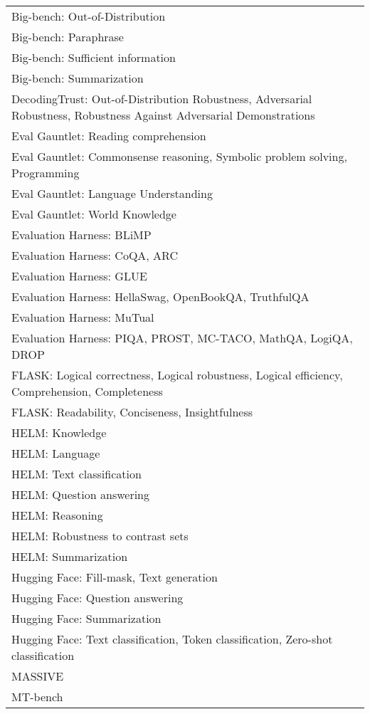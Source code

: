 \documentclass[fleqn]{article}
\begin{document}
\begin{table}[H]
\begin{tabular}{l}
		Big-bench: Out-of-Distribution \\
		Big-bench: Paraphrase \\
		Big-bench: Sufficient information \\
		Big-bench: Summarization \\
		DecodingTrust: Out-of-Distribution Robustness, Adversarial Robustness, 			Robustness Against Adversarial Demonstrations\\
		Eval Gauntlet: Reading comprehension \cite{evalgauntlet} \\
		Eval Gauntlet: Commonsense reasoning, Symbolic problem solving, Programming \\
		Eval Gauntlet: Language Understanding  \\
		Eval Gauntlet: World Knowledge \\
		Evaluation Harness: BLiMP \\
		Evaluation Harness: CoQA, ARC \\
		Evaluation Harness: GLUE \\
		Evaluation Harness: HellaSwag, OpenBookQA, TruthfulQA \\
		Evaluation Harness: MuTual \\
		Evaluation Harness: PIQA, PROST, MC-TACO, MathQA, LogiQA, DROP \\
		FLASK: Logical correctness, Logical robustness, Logical efficiency, Comprehension, Completeness \cite{flask}  \\
		FLASK: Readability, Conciseness, Insightfulness \\
		HELM: Knowledge \\
		HELM: Language \\
		HELM: Text classification \\
		HELM: Question answering \\
		HELM: Reasoning \\
		HELM: Robustness to contrast sets \\
		HELM: Summarization \\
		Hugging Face: Fill-mask, Text generation \cite{huggingface} \\
		Hugging Face: Question answering \\
		Hugging Face: Summarization \\
		Hugging Face: Text classification, Token classification, Zero-shot classification \\
		MASSIVE \cite{massive} \\
		MT-bench \\
		\bottomrule
	\end{tabular}	
\end{table}
\end{document}
